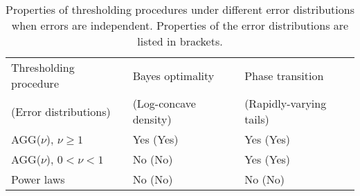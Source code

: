 \begin{table}[ht]
    \centering
    \caption{Properties of thresholding procedures under different error distributions when errors are independent. Properties of the error distributions are listed in brackets.}
    \medskip
    \begin{tabular}{p{45mm}p{40mm}p{40mm}} \toprule
        Thresholding procedure & Bayes optimality &  Phase transition \\ 
        (Error distributions) &  (Log-concave density) & (Rapidly-varying tails) \\ \midrule
        AGG($\nu$), $\nu\ge1$ & Yes (Yes) & Yes (Yes) \\ \cmidrule{1-3}
        AGG($\nu$), $0<\nu<1$ & No (No) & Yes (Yes) \\ \cmidrule{1-3}
        Power laws & No (No) & No (No) \\ \bottomrule
    \end{tabular}
    \label{table:role-of-thresholding}
\end{table}







